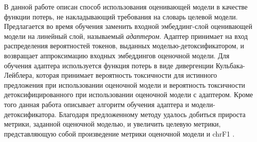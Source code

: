 В данной работе описан способ использования оценивающей модели в качестве функции потерь, не накладывающий требования на словарь целевой модели. 
Предлагается во время обучения заменить входной эмбеддинг-слой оценивающей модели на линейный слой, называемый \textit{адаптером}.
Адаптер принимает на вход распределения вероятностей токенов, выданных моделью-детоксификатором, и возвращает аппроксимацию входных эмбеддингов оценочной модели. 
Для обучения адаптера используется функция потерь в виде дивергенции Кульбака-Лейблера, которая принимает вероятность токсичности для истинного предложения при использовании оценочной модели и вероятность токсичности детоксифицированного при использовании оценочной модели с адаптером.
Кроме того данная работа описывает алгоритм обучения адаптера и модели-детоксификатора.
Благодаря предложенному методу удалось добиться прироста метрики, заданной оценочной моделью, и увеличить целевую метрики, представляющую собой произведение метрики оценочной модели и chrF1 \cite{popovic-2015-chrf}.